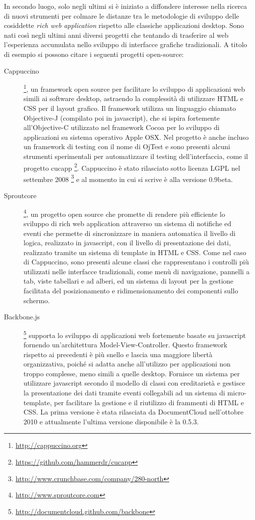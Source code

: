 In secondo luogo, solo negli ultimi si è iniziato a diffondere interesse nella ricerca di nuovi strumenti per colmare le distanze tra le metodologie di sviluppo delle cosiddette \emph{rich web application} rispetto alle classiche applicazioni desktop. Sono nati così negli ultimi anni diversi progetti che tentando di trasferire al web l'esperienza accumulata nello sviluppo di interfacce grafiche tradizionali. A titolo di esempio si possono citare i seguenti progetti open-source:

\begin{description}
\item[Cappuccino]  \footnote{\url{http://cappuccino.org}}, un framework open source per facilitare lo sviluppo di applicazioni web simili ai software desktop, astraendo la complessità di utilizzare HTML e CSS per il layout grafico. Il framework utilizza un linguaggio chiamato Objective-J (compilato poi in javascript), che si ispira fortemente all'Objective-C utilizzato nel framework Cocoa per lo sviluppo di applicazioni su sistema operativo Apple OSX. Nel progetto è anche incluso un framework di testing con il nome di OjTest e sono presenti alcuni strumenti sperimentali per automatizzare il testing dell'interfaccia, come il progetto cucapp \footnote{\url{https://github.com/hammerdr/cucapp}}. Cappuccino è stato rilasciato sotto licenza LGPL nel settembre 2008 \footnote{\url{http://www.crunchbase.com/company/280-north}} e al momento in cui si scrive è alla versione 0.9beta.

\item[Sproutcore] \footnote{\url{http://www.sproutcore.com}}, un progetto open source che promette di rendere più efficiente lo sviluppo di rich web application attraverso un sistema di notifiche ed eventi che permette di sincronizzare in maniera automatica il livello di logica, realizzato in javascript, con il livello di presentazione dei dati, realizzato tramite un sistema di template in HTML e CSS. Come nel caso di Cappuccino, sono presenti alcune classi che rappresentano i controlli più utilizzati nelle interfacce tradizionali, come menù di navigazione, pannelli a tab, viste tabellari e ad alberi, ed un sistema di layout per la gestione facilitata del posizionamento e ridimensionamento dei componenti sullo schermo.

\item[Backbone.js] \footnote{\url{http://documentcloud.github.com/backbone}} supporta lo sviluppo di applicazioni web fortemente basate su javascript fornendo un'architettura Model-View-Controller. Questo framework rispetto ai precedenti è più snello e lascia una maggiore libertà organizzativa, poiché si adatta anche all'utilizzo per applicazioni non troppo complesse, meno simili a quelle desktop. Fornisce un sistema per utilizzare javascript secondo il modello di classi con ereditarietà e gestisce la presentazione dei dati tramite eventi collegabili ad un sistema di micro-template, per facilitare la gestione e il riutilizzo di frammenti di HTML e CSS. La prima versione è stata rilasciata da DocumentCloud nell'ottobre 2010 e attualmente l'ultima versione disponibile è la 0.5.3.

\end{description} 

